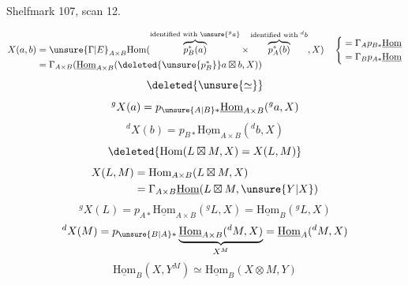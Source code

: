 Shelfmark 107, scan 12.

\[
\begin{aligned}
X(a,b)&=\unsure{\Gamma|E}_{A\times B}\mathrm{Hom}(\overbrace{p_B^*(a)}^{\text{identified with }\unsure{{}^g a}}\times\overbrace{p_A^*(b)}^{\text{identified with }{}^d b},X)\\
&=\Gamma_{A\times B}(\underline{\mathrm{Hom}}_{A\times B}(\deleted{\unsure{p_B^*}}a\boxtimes b,X))
\end{aligned}
\quad\left\{\begin{aligned}&=\Gamma_A p_{B*}\underline{\mathrm{Hom}}\\&=\Gamma_B p_{A*}\underline{\mathrm{Hom}}\end{aligned}\right.
\]
\[
\deleted{\unsure{\simeq}}
\]
\[
{}^gX(a)=p_{\unsure{A|B}*}\underline{\mathrm{Hom}}_{A\times B}({}^ga,X)
\]
\[
{}^dX(b)=p_{B*}\underline{\mathrm{Hom}}_{A\times B}({}^db,X)
\]
\[
\deleted{\mathrm{Hom}(L\boxtimes M,X)=X(L,M)}
\]
\[
\begin{aligned}
X(L,M)&=\mathrm{Hom}_{A\times B}(L\boxtimes M,X)\\
&=\Gamma_{A\times B}\underline{\mathrm{Hom}}(L\boxtimes M,\unsure{Y|X})
\end{aligned}
\]
\[
{}^gX(L)=p_{A*}\underline{\mathrm{Hom}}_{A\times B}({}^gL,X)=\underline{\mathrm{Hom}}_B({}^gL,X)
\]
\[
{}^dX(M)=p_{\unsure{B|A}*}\underbrace{\underline{\mathrm{Hom}}_{A\times B}({}^dM,X)}_{X^M}=\underline{\mathrm{Hom}}_A({}^dM,X)
\]
\[
\underline{\mathrm{Hom}}_B(X,Y^M)\simeq\underline{\mathrm{Hom}}_B(X\otimes M,Y)
\]

